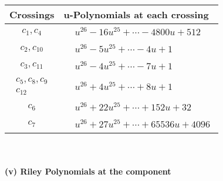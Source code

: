 \documentclass[1p]{elsarticle_modified}
\theoremstyle{definition}
\begin{document}
\begin{tabular}{m{50pt}|m{274pt}}
Crossings & \hspace{64pt}u-Polynomials at each crossing \\
\hline $$\begin{aligned}c_{1},c_{4}\end{aligned}$$&$\begin{aligned}
&u^{26}-16 u^{25}+\cdots-4800 u+512
\end{aligned}$\\
\hline $$\begin{aligned}c_{2},c_{10}\end{aligned}$$&$\begin{aligned}
&u^{26}-5 u^{25}+\cdots-4 u+1
\end{aligned}$\\
\hline $$\begin{aligned}c_{3},c_{11}\end{aligned}$$&$\begin{aligned}
&u^{26}-4 u^{25}+\cdots-7 u+1
\end{aligned}$\\
\hline $$\begin{aligned}c_{5},c_{8},c_{9}\\c_{12}\end{aligned}$$&$\begin{aligned}
&u^{26}+4 u^{25}+\cdots+8 u+1
\end{aligned}$\\
\hline $$\begin{aligned}c_{6}\end{aligned}$$&$\begin{aligned}
&u^{26}+22 u^{25}+\cdots+152 u+32
\end{aligned}$\\
\hline $$\begin{aligned}c_{7}\end{aligned}$$&$\begin{aligned}
&u^{26}+27 u^{25}+\cdots+65536 u+4096
\end{aligned}$\\
\hline
\end{tabular}\\~\\
\newpage\renewcommand{\arraystretch}{1}
\flushleft \textbf{(v) Riley Polynomials at the component}\newline \\
\end{document}
